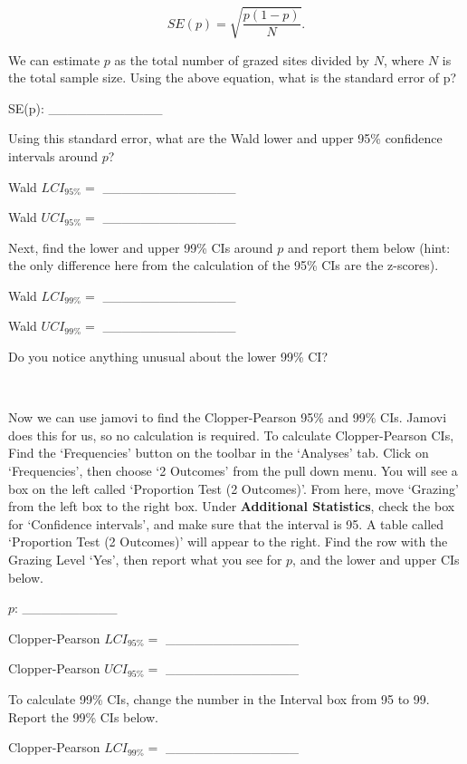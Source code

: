 \documentclass[
  openany]{scrbook}
\begin{document}
\[SE(p) = \sqrt{\frac{p\left(1 - p\right)}{N}}.\]

We can estimate \(p\) as the total number of grazed sites divided by \(N\), where \(N\) is the total sample size.
Using the above equation, what is the standard error of p?

SE(p): \_\_\_\_\_\_\_\_\_\_\_\_

Using this standard error, what are the Wald lower and upper 95\% confidence intervals around \(p\)?

Wald \(LCI_{95\%} =\) \_\_\_\_\_\_\_\_\_\_\_\_\_\_

Wald \(UCI_{95\%} =\) \_\_\_\_\_\_\_\_\_\_\_\_\_\_

Next, find the lower and upper 99\% CIs around \(p\) and report them below (hint: the only difference here from the calculation of the 95\% CIs are the z-scores).

Wald \(LCI_{99\%} =\) \_\_\_\_\_\_\_\_\_\_\_\_\_\_

Wald \(UCI_{99\%} =\) \_\_\_\_\_\_\_\_\_\_\_\_\_\_

Do you notice anything unusual about the lower 99\% CI?

\begin{verbatim}


\end{verbatim}

Now we can use jamovi to find the Clopper-Pearson 95\% and 99\% CIs.
Jamovi does this for us, so no calculation is required.
To calculate Clopper-Pearson CIs, Find the `Frequencies' button on the toolbar in the `Analyses' tab.
Click on `Frequencies', then choose `2 Outcomes' from the pull down menu.
You will see a box on the left called `Proportion Test (2 Outcomes)'.
From here, move `Grazing' from the left box to the right box.
Under \textbf{Additional Statistics}, check the box for `Confidence intervals', and make sure that the interval is 95.
A table called `Proportion Test (2 Outcomes)' will appear to the right.
Find the row with the Grazing Level `Yes', then report what you see for \(p\), and the lower and upper CIs below.

\(p\): \_\_\_\_\_\_\_\_\_\_

Clopper-Pearson \(LCI_{95\%} =\) \_\_\_\_\_\_\_\_\_\_\_\_\_\_

Clopper-Pearson \(UCI_{95\%} =\) \_\_\_\_\_\_\_\_\_\_\_\_\_\_

To calculate 99\% CIs, change the number in the Interval box from 95 to 99.
Report the 99\% CIs below.

Clopper-Pearson \(LCI_{99\%} =\) \_\_\_\_\_\_\_\_\_\_\_\_\_\_
\end{document}
